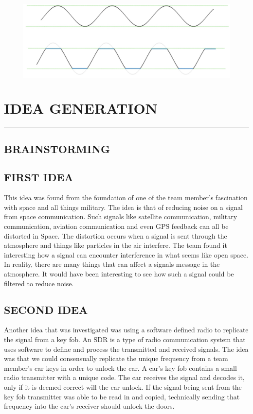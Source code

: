 \documentclass[12pt,a4paper]{article}
\begin{document}
			\begin{figure}[H]
				\begin{center}
					\includegraphics[width=0.7\linewidth]{Clipping}
				\end{center}
			\end{figure}
\newpage
\section{IDEA GENERATION}
\vspace{-5mm}
\rule{\linewidth}{0.1mm}
\normalsize
	\subsection{BRAINSTORMING}
	\subsection{FIRST IDEA}
		This idea was found from the foundation of one of the team member's fascination with space and all things military. The
		idea is that of reducing noise on a signal from space communication. 
		Such signals like satellite communication, military communication, aviation communication and even GPS feedback can all be distorted in Space.
		The distortion occurs when a signal is sent through the atmosphere and things like particles in the air interfere. 
		The team found it interesting how a signal can encounter interference in what seems like open space.
		In reality, there are many things that can affect a signals message in the atmosphere.
		It would have been interesting to see how such a signal could be filtered to reduce noise.\cite{ESA}
	\subsection{SECOND IDEA}
		Another idea that was investigated was using a software defined radio to replicate the signal from a key fob. 
		An SDR is a type of radio communication system that uses software to define and process the transmitted and received signals. 
		The idea was that we could consensually replicate the unique frequency from a team member's car keys in order to unlock the car. 
		A car's key fob contains a small radio transmitter with a unique code. 
		The car receives the signal and decodes it, only if it is deemed correct will the car unlock. 
		If the signal being sent from the key fob transmitter was able to be read in and copied, technically sending that frequency into the car's receiver should unlock the doors.
\end{document}
